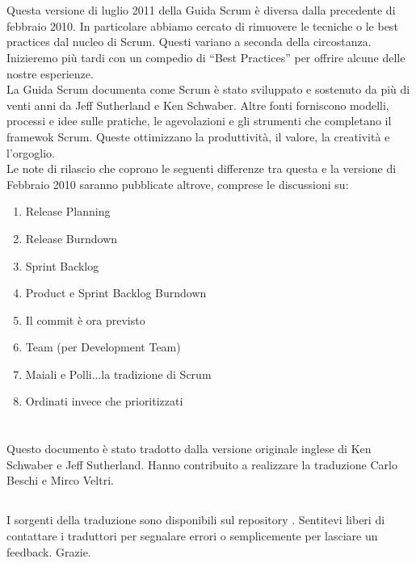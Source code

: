 \newpage
\section*{\color{Blue}{Revisioni}}
\label{sec:revisions}
Questa versione di luglio 2011 della Guida Scrum è diversa dalla precedente di febbraio 2010. In particolare abbiamo cercato di rimuovere le 
tecniche o le best practices dal nucleo di Scrum. Questi variano a seconda della circostanza. Inizieremo pi\`u tardi con un compedio di 
``Best Practices'' per offrire alcune delle nostre esperienze.
\newline
\\La Guida Scrum documenta come Scrum \`e stato sviluppato e sostenuto da pi\`u di venti anni da Jeff Sutherland e Ken Schwaber. Altre fonti 
forniscono modelli, processi e idee sulle pratiche, le agevolazioni e gli strumenti che completano il framewok Scrum. Queste ottimizzano la 
produttività, il valore, la creatività e l'orgoglio.
\newline
\\Le note di rilascio che coprono le seguenti differenze tra questa e la versione di Febbraio 2010 saranno pubblicate altrove, comprese le 
discussioni su:

\begin{enumerate}
 	\item Release Planning
	\item Release Burndown
	\item Sprint Backlog
	\item Product e Sprint Backlog Burndown
	\item Il commit \`e ora previsto
	\item Team (per Development Team)
	\item Maiali e Polli...la tradizione di Scrum
	\item Ordinati invece che prioritizzati 
\end{enumerate}

\newpage
\section*{\color{Blue}{Traduzione}}
\label{sec:translation}
Questo documento \`e stato tradotto dalla versione originale inglese di Ken Schwaber e Jeff Sutherland. Hanno contribuito a realizzare la 
traduzione Carlo Beschi e Mirco Veltri.

\subsection*{\color{SteelBlue}{Note alla versione italiana}}
\label{sec:transnotes}
I sorgenti della traduzione sono disponibili sul repository . 
Sentitevi liberi di contattare i traduttori per segnalare errori o semplicemente per lasciare un feedback. Grazie.